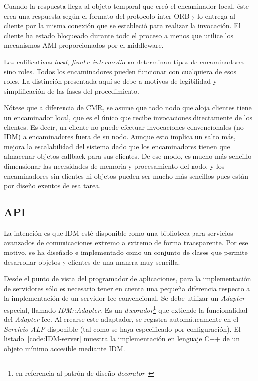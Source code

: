 \documentclass{arco-article}
\newcommand{\iface}[1]{\textit{#1}}
\newcommand{\fg}[1]{\textit{#1}}
\def \mw {middleware}
\begin{document}
Cuando la respuesta llega al objeto temporal que creó el encaminador
local, éste crea una respuesta según el formato del protocolo
inter-\ac{ORB} y lo entrega al cliente por la misma conexión que se
estableció para realizar la invocación. El cliente ha estado bloqueado
durante todo el proceso a menos que utilice los mecanismos \ac{AMI}
proporcionados por el \mw.

Los calificativos \emph{local}, \emph{final} e \emph{intermedio} no
determinan tipos de encaminadores sino roles. Todos los encaminadores
pueden funcionar con cualquiera de esos roles. La distinción
presentada aquí se debe a motivos de legibilidad y
simplificación de las fases del procedimiento.

Nótese que a diferencia de \ac{CMR}, se asume que todo nodo que aloja
clientes tiene un encaminador local, que es el único que recibe
invocaciones directamente de los clientes. Es decir, un cliente no
puede efectuar invocaciones convencionales (no-\ac{IDM}) a
encaminadores fuera de su nodo. Aunque esto implica un salto más,
mejora la escalabilidad del sistema dado que los encaminadores
tienen que almacenar objetos callback para sus clientes. De ese
modo, es mucho más sencillo dimensionar las necesidades de memoria y
procesamiento del nodo, y los encaminadores sin clientes ni objetos
pueden ser mucho más sencillos pues están por diseño exentos de esa
tarea.


\subsection{API}

La intención es que \ac{IDM} esté disponible como una biblioteca
para servicios avanzados de comunicaciones extremo a extremo de
forma transparente.  Por ese motivo, se ha diseñado e implementado
como un conjunto de clases que permite desarrollar objetos y
clientes de una manera muy sencilla.

Desde el punto de vista del programador de aplicaciones, para la
implementación de servidores sólo es necesario tener en cuenta una
pequeña diferencia respecto a la implementación de un servidor
\ac{Ice} convencional. Se debe utilizar un \emph{Adapter} especial,
llamado \iface{IDM::Adapter}. Es un \emph{decorador}\footnote{en
  referencia al patrón de diseño
  \fg{decorator}~\cite{design_patterns}} que extiende la funcionalidad
del \emph{Adapter} \ac{Ice}.  Al crearse este adaptador, se registra
automáticamente en el \emph{Servicio ALP} disponible (tal como se haya
especificado por configuración). El listado~\ref{code:IDM-server}
muestra la implementación en lenguaje C++ de un objeto mínimo
accesible mediante \ac{IDM}.
\end{document}

